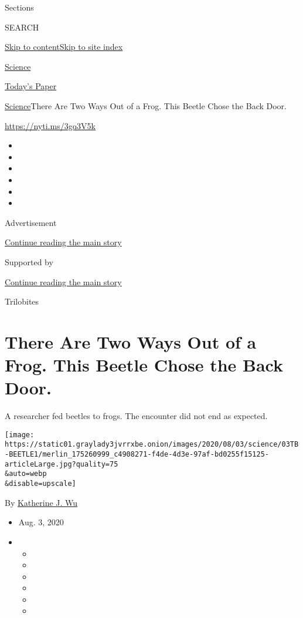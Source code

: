 Sections

SEARCH

\protect\hyperlink{site-content}{Skip to
content}\protect\hyperlink{site-index}{Skip to site index}

\href{https://www.nytimes3xbfgragh.onion/section/science}{Science}

\href{https://myaccount.nytimes3xbfgragh.onion/auth/login?response_type=cookie\&client_id=vi}{}

\href{https://www.nytimes3xbfgragh.onion/section/todayspaper}{Today's
Paper}

\href{/section/science}{Science}\textbar{}There Are Two Ways Out of a
Frog. This Beetle Chose the Back Door.

\url{https://nyti.ms/3gq3V5k}

\begin{itemize}
\item
\item
\item
\item
\item
\item
\end{itemize}

Advertisement

\protect\hyperlink{after-top}{Continue reading the main story}

Supported by

\protect\hyperlink{after-sponsor}{Continue reading the main story}

Trilobites

\hypertarget{there-are-two-ways-out-of-a-frog-this-beetle-chose-the-back-door}{%
\section{There Are Two Ways Out of a Frog. This Beetle Chose the Back
Door.}\label{there-are-two-ways-out-of-a-frog-this-beetle-chose-the-back-door}}

A researcher fed beetles to frogs. The encounter did not end as
expected.

\texttt{[image: https://static01.graylady3jvrrxbe.onion/images/2020/08/03/science/03TB-BEETLE1/merlin\_175260999\_c4908271-f4de-4d3e-97af-bd0255f15125-articleLarge.jpg?quality=75\\\&auto=webp\\\&disable=upscale]}

By
\href{https://www.nytimes3xbfgragh.onion/by/katherine-j--wu}{Katherine
J. Wu}

\begin{itemize}
\item
  Aug. 3, 2020
\item
  \begin{itemize}
  \item
  \item
  \item
  \item
  \item
  \item
  \end{itemize}
\end{itemize}

